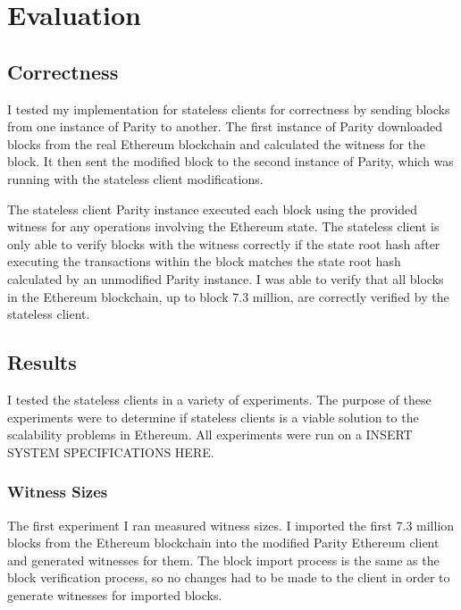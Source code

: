 \documentclass[12pt]{article}
\begin{document}
\section{Evaluation}

\subsection{Correctness}

I tested my implementation for stateless clients for correctness by sending blocks from one instance of Parity to another. The first instance of Parity downloaded blocks from the real Ethereum blockchain and calculated the witness for the block. It then sent the modified block to the second instance of Parity, which was running with the stateless client modifications.

The stateless client Parity instance executed each block using the provided witness for any operations involving the Ethereum state. The stateless client is only able to verify blocks with the witness correctly if the state root hash after executing the transactions within the block matches the state root hash calculated by an unmodified Parity instance. I was able to verify that all blocks in the Ethereum blockchain, up to block 7.3 million, are correctly verified by the stateless client.

\subsection{Results} \label{subsection:results}

I tested the stateless clients in a variety of experiments. The purpose of these experiments were to determine if stateless clients is a viable solution to the scalability problems in Ethereum. All experiments were run on a INSERT SYSTEM SPECIFICATIONS HERE.

\subsubsection{Witness Sizes}

The first experiment I ran measured witness sizes. I imported the first 7.3 million blocks from the Ethereum blockchain into the modified Parity Ethereum client and generated witnesses for them. The block import process is the same as the block verification process, so no changes had to be made to the client in order to generate witnesses for imported blocks.
\end{document}
